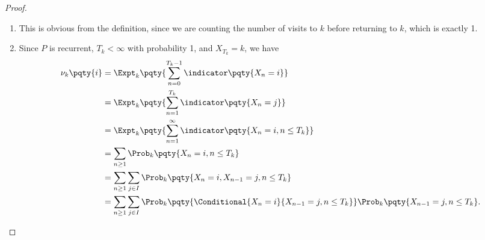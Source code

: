 \begin{proof}
    \begin{enumerate}[label=(\roman*)]
        \item This is obvious from the definition, since we are counting the number of visits to \(k\) before returning to \(k\), which is exactly 1.
        \item[(iii)] Since \(P\) is recurrent, \(T_k < \infty\) with probability 1, and \(X_{T_k} = k\), we have
        \begin{align*}
            \nu_k \pqty{i} &= \Expt_k \pqty{\sum_{n = 0}^{T_k - 1} \indicator\pqty{X_n = i}} \\
            &= \Expt_k \pqty{\sum_{n = 1}^{T_k} \indicator\pqty{X_n = j}} \\
            &= \Expt_k \pqty{\sum_{n = 1}^{\infty} \indicator\pqty{X_n = i, n \leq T_k}} \\
            &= \sum_{n \geq 1} \Prob_k \pqty{X_n = i, n \leq T_k} \\
            &= \sum_{n \geq 1} \sum_{j \in I} \Prob_k \pqty{X_n = i, X_{n - 1} = j, n \leq T_k} \\
            &= \sum_{n \geq 1} \sum_{j \in I} \Prob_k \pqty{\Conditional{X_n = i}{X_{n - 1} = j, n \leq T_k}} \Prob_k \pqty{X_{n - 1} = j, n \leq T_k}.
        \end{align*}


\end{enumerate}
\end{proof}
